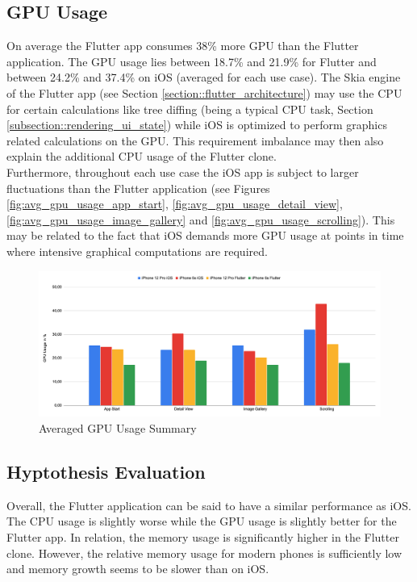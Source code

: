 \subsection{GPU Usage}
On average the Flutter app consumes 38\% more GPU than the Flutter application. The GPU usage lies between 18.7\% and 21.9\% for Flutter and between 24.2\% and 37.4\% on iOS (averaged for each use case).
The Skia engine of the Flutter app (see Section \ref{section::flutter_architecture}) may use the CPU for certain calculations like tree diffing (being a typical CPU task, Section \ref{subsection::rendering_ui_state}) while iOS is optimized to perform graphics related calculations on the GPU.
This requirement imbalance may then also explain the additional CPU usage of the Flutter clone.\\
Furthermore, throughout each use case the iOS app is subject to larger fluctuations than the Flutter application (see Figures \ref{fig:avg_gpu_usage_app_start}, \ref{fig:avg_gpu_usage_detail_view}, \ref{fig:avg_gpu_usage_image_gallery} and \ref{fig:avg_gpu_usage_scrolling}).
This may be related to the fact that iOS demands more GPU usage at points in time where intensive graphical computations are required.

\begin{figure}[!h]
    \centering
    \includegraphics[width=\linewidth]{images/performance_results/summary_charts/avg_gpu_usage_summary.png}
    \caption{Averaged GPU Usage Summary}
    \label{fig:avg_gpu_usage_summary}
\end{figure}

\subsection{Hyptothesis Evaluation} \label{subsection::hypothesis_evaluation}
Overall, the Flutter application can be said to have a similar performance as iOS. The CPU usage is slightly worse while the GPU usage is slightly better for the Flutter app.
In relation, the memory usage is significantly higher in the Flutter clone. However, the relative memory usage for modern phones is sufficiently low and memory growth seems to be slower than
on iOS.

